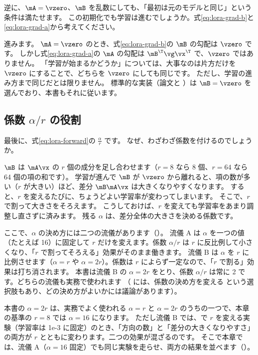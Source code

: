 \begin{quiz}
逆に、$\mA=\vzero$、$\mB$ を乱数にしても、「最初は元のモデルと同じ」という条件は満たせます。
この初期化でも学習は進むでしょうか。式\eqref{eq:lora-grad-b}と\eqref{eq:lora-grad-a}から考えてください。
\end{quiz}

進みます。
$\mA=\vzero$ のとき、式\eqref{eq:lora-grad-b}の $\mB$ の勾配は $\vzero$ です。
しかし式\eqref{eq:lora-grad-a}の $\mA$ の勾配は $\mB^\T\vg\vx^\T$ で、$\vzero$ ではありません。
「学習が始まるかどうか」については、大事なのは片方だけを $\vzero$ にすることで、どちらを $\vzero$ にしても同じです。
ただし、学習の進み方まで同じだとは限りません。
標準的な実装（論文と ）は $\mB=\vzero$ を選んでおり、本書もそれに従います。

\subsection{係数 $\alpha/r$ の役割}\label{sec:lora-alpha}

最後に、式\eqref{eq:lora-forward}の $\frac{\alpha}{r}$ です。
なぜ、わざわざ係数を付けるのでしょうか。

$\mB$ は $\mA\vx$ の $r$ 個の成分を足し合わせます（$r=8$ なら 8 個、$r=64$ なら 64 個の項の和です）。
学習が進んで $\mB$ が $\vzero$ から離れると、項の数が多い（$r$ が大きい）ほど、差分 $\mB\mA\vx$ は大きくなりやすくなります。
すると、$r$ を変えるたびに、ちょうどよい学習率が変わってしまいます。
そこで、$r$ で割って大きさをそろえます。
こうしておけば、$r$ を変えても学習率をあまり調整し直さずに済みます\cite{hu2022lora}。
残る $\alpha$ は、差分全体の大きさを決める係数です。

ここで、$\alpha$ の決め方には二つの流儀があります（）。
流儀 A は $\alpha$ を一つの値（たとえば 16）に固定して $r$ だけを変えます。係数 $\alpha/r$ は $r$ に反比例して小さくなり、「$r$ で割ってそろえる」効果がそのまま働きます。
流儀 B は $\alpha$ を $r$ に比例させます（$\alpha=r$ や $\alpha=2r$）。係数は $r$ によらず一定なので、「$r$ で割る」効果は打ち消されます。
本書は流儀 B の $\alpha=2r$ をとり、係数 $\alpha/r$ は常に 2 です。どちらの流儀も実務で使われます
（ には、係数の決め方を変える  という選択肢もあり、どの決め方がよいかには議論があります）。


本書の $\alpha=2r$ は、実務でよく使われる $\alpha=r$ と $\alpha=2r$ のうちの一つで、本章の基準の $r=8$ では $\alpha=16$ になります。
ただし流儀 B では、で $r$ を変える実験（学習率は 1e-3 に固定）のとき、「方向の数」と「差分の大きくなりやすさ」の両方が $r$ とともに変わります。二つの効果が混ざるのです。
そこで本章では、流儀 A（$\alpha=16$ 固定）でも同じ実験を走らせ、両方の結果を並べます（）。

